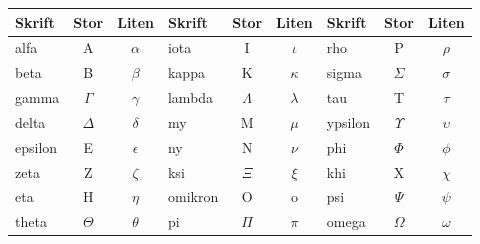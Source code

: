 \begin{center}
\begin{tabular}{|l|cc|l|cc|lcc|} \hline
Skrift & Stor & Liten    &Skrift  & Stor & Liten &Skrift & Stor&Liten\\ \hline
alfa   & A    & $\alpha$  & iota   & I  & $\iota$    & rho & P  & $\rho$   \\
beta   & B    &$\beta$  & kappa  & K  &$\kappa$ & sigma & $\Sigma$ &$\sigma$ \\
gamma  &$\Gamma$&$\gamma$& lambda &$\Lambda$&$\lambda$& tau & T &$\tau$ \\
delta  &$\Delta$&$\delta$& my     & M &$\mu$& ypsilon &$\Upsilon$&$\upsilon$\\
epsilon& E    &$\epsilon$& ny     & N   &$\nu$     & phi &$\Phi$&$\phi$   \\
zeta   & Z    &$\zeta$   & ksi    &$\Xi$&$\xi$     & khi & X  &$\chi$   \\
eta    & H    &$\eta$    & omikron& O   & o        & psi &$\Psi$&$\psi$  \\
theta  &$\Theta$&$\theta$& pi     &$\Pi$&$\pi$   & omega &$\Omega$ &$\omega$ \\
\hline
\end{tabular}
\end{center}

